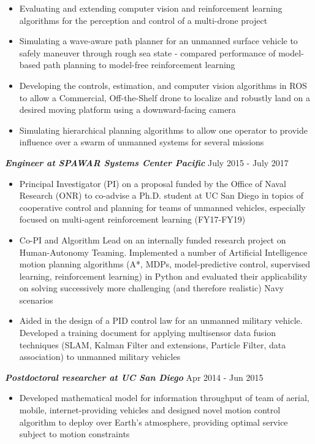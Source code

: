 \documentclass{res}
\begin{document}
\begin{resume}
 \vspace*{-0ex} 
\begin{itemize}
\item Evaluating and extending computer vision and reinforcement learning algorithms for the perception and control of a multi-drone project
\item Simulating a wave-aware path planner for an unmanned surface vehicle to safely maneuver through rough sea state -  compared performance of model-based path planning to model-free reinforcement learning
\item Developing the controls, estimation, and computer vision algorithms in ROS to allow a Commercial, Off-the-Shelf drone to localize and robustly land on a desired moving platform using a downward-facing camera
\item Simulating hierarchical planning algorithms to allow one operator to provide influence over a swarm of unmanned systems for several missions 
\end{itemize}
\vspace*{-1ex}
{\sl \bf Engineer at SPAWAR Systems Center Pacific} \hfill July 2015 - July 2017 
\begin{itemize}
\item Principal Investigator (PI) on a proposal funded by the Office of Naval Research (ONR) to co-advise a Ph.D. student at UC San Diego in topics of cooperative control and planning for teams of unmanned vehicles, especially focused on multi-agent reinforcement learning (FY17-FY19)
\item Co-PI and Algorithm Lead on an internally funded research project on Human-Autonomy Teaming. Implemented a number of Artificial Intelligence motion planning algorithms (A*, MDPs, model-predictive control, supervised learning, reinforcement learning) in Python and evaluated their applicability on solving successively more challenging (and therefore realistic) Navy scenarios
\item Aided in the design of a PID control law for an unmanned military vehicle.  Developed a training document for applying multisensor data fusion techniques (SLAM, Kalman Filter and extensions, Particle Filter, data association) to unmanned military vehicles
\end{itemize}
\vspace*{-1ex}
{\sl \bf Postdoctoral researcher at UC San Diego} \hfill Apr 2014 - Jun 2015 
\begin{itemize}
\item Developed mathematical model for information throughput of team of aerial, mobile, internet-providing vehicles and designed novel motion control algorithm to deploy over Earth's atmosphere, providing optimal service subject to motion constraints

\end{itemize}
\end{resume}
\end{document}
